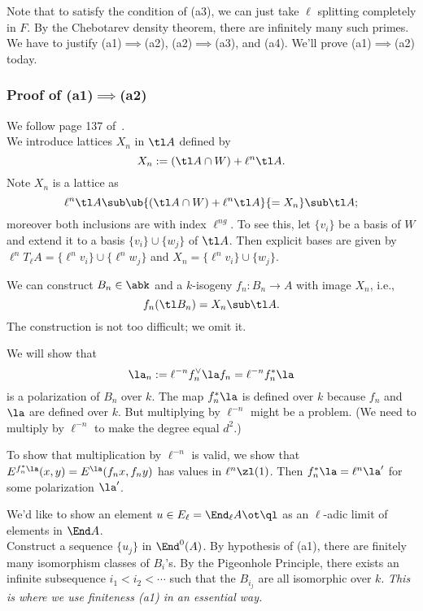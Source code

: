 Note that to satisfy the condition of (a3), we can just take $\ell$ splitting completely in $F$.
By the Chebotarev density theorem, there are infinitely many such primes. We have to justify (a1)$\implies$(a2), (a2)$\implies$(a3), and (a4). We'll prove (a1)$\implies$(a2) today.

\subsubsection{Proof of (a1)$\implies$(a2)}
We follow page 137 of~\cite{Ta66}.\\

 We introduce lattices $X_n$ in $\tl A$ defined by
\[
X_n:=(\tl A\cap W)+\ell^n \tl A.
\]
Note $X_n$ is a lattice as 
\[
\ell^n \tl A\sub \ub{(\tl A\cap W) +\ell^n\tl A}{=X_n} \sub \tl A;
\]
moreover both inclusions are with index $\ell^{ng}$. To see this, let $\{v_i\}$ be a basis of $W$ and extend it to a basis $\{v_i\}\cup \{w_j\}$ of $\tl A$. Then explicit bases are given by $\ell^nT_{\ell}A=\{\ell^n v_i\}\cup \{\ell^n w_j\}$ and  $X_n=\{\ell^nv_i\}\cup \{w_j\}$.

We can construct $B_n\in \abk $ and a $k$-isogeny $f_n:B_n\to A$ with image $X_n$, i.e., 
\[f_n(\tl B_n)=X_n\sub \tl A.\] 
The construction is not too difficult; we omit it. %

 We will show that 
\[\la_n:=\ell^{-n} %
{f_n^{\vee}\la f_n}%
=\ell^{-n} f_n^*\la
\]
is a polarization of $B_n$ over $k$. 
The map $f_n^*\la$ is defined over $k$ because $f_n$ and $\la$ are defined over $k$. But multiplying by $\ell^{-n}$ might be a problem. (We need to multiply by $\ell^{-n}$ to make the degree equal $d^2$.)

To show that multiplication by $\ell^{-n}$ is valid, we show that $E^{f_n^*\la }(x,y)=E^{\la}(f_nx, f_ny)$ has values in $\ell^n \zl(1)$. Then $f_n^*\la=\ell^n \la'$ for some polarization $\la'$.


We'd like to show an element $u\in E_{\ell}=\End_{\ell}A\ot \ql$ as an $\ell$-adic limit of elements in $\End A$.\\

 Construct a sequence $\{u_j\}$ in $\End^0(A)$. By hypothesis of (a1), there are finitely many isomorphism classes of $B_i$'s.
By the Pigeonhole Principle, there exists an infinite subsequence $i_1<i_2<\cdots$ such that the $B_{i_j}$ are all isomorphic over $k$. {\it This is where we use finiteness (a1) in an essential way.}


